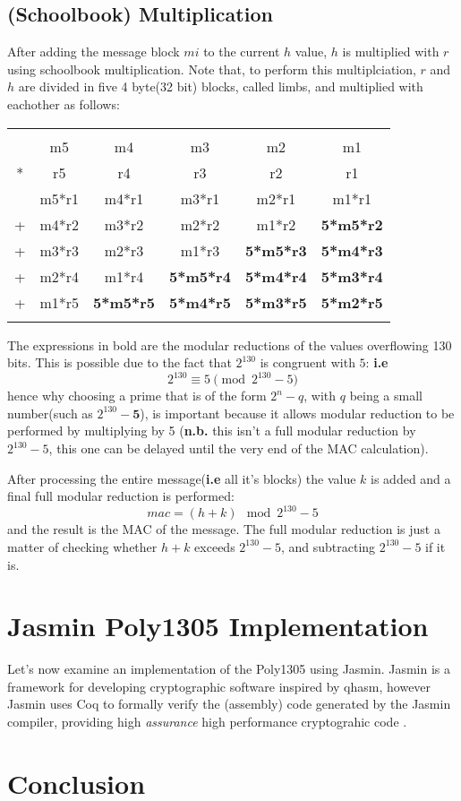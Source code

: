 \documentclass[twocolumn]{article}
\begin{document}
\subsection{(Schoolbook) Multiplication}
After adding the message block $mi$ to the current $h$ value, $h$ is multiplied with $r$ using schoolbook multiplication. Note that, to perform this multiplciation, 
$r$ and $h$ are divided in five 4 byte(32 bit) blocks, called limbs, and multiplied with eachother as follows:
\begin{footnotesize}
\begin{tabular}{cccccc}
    &    &    &    &    &    \\
    & m5 & m4 & m3 & m2 & m1 \\
*   & r5 & r4 & r3 & r2 & r1 \\
\hline
    & m5*r1 & m4*r1 & m3*r1 & m2*r1 & m1*r1 \\
+   & m4*r2 & m3*r2 & m2*r2 & m1*r2 & \textbf{5*m5*r2} \\
+   & m3*r3 & m2*r3 & m1*r3 & \textbf{5*m5*r3} & \textbf{5*m4*r3} \\
+   & m2*r4 & m1*r4 & \textbf{5*m5*r4} & \textbf{5*m4*r4} & \textbf{5*m3*r4} \\
+   & m1*r5 & \textbf{5*m5*r5} & \textbf{5*m4*r5} & \textbf{5*m3*r5} & \textbf{5*m2*r5}\\
    &    &    &    &    &    \\
\end{tabular}
\end{footnotesize}
The expressions in bold are the modular reductions of the values overflowing 130 bits. This is possible due to the fact that $2^{130}$ is congruent with $5$:
\textbf{i.e} $$2^{130} \equiv 5 \pmod{2^{130}-5}$$ hence why choosing a prime that is of the form $2^n-q$, with $q$ being a small number(such as $2^{130}-\textbf{5}$), 
is important because it allows modular reduction to be performed by multiplying by 5 (\textbf{n.b.} this isn't a full modular reduction by $2^{130}-5$, this one can be 
delayed until the very end of the MAC calculation).

After processing the entire message(\textbf{i.e} all it's blocks) the value $k$ is added and a final full modular reduction is performed:
$$mac = (h+k) \mod{2^{130}-5} $$
and the result is the MAC of the message.
\newline
The full modular reduction is just a matter of checking whether $h+k$ exceeds $2^{130}-5$, and subtracting $2^{130}-5$ if it is.

\section{Jasmin Poly1305 Implementation}
Let's now examine an implementation of the Poly1305 using Jasmin. Jasmin is a framework for developing cryptographic software inspired by qhasm, however Jasmin uses Coq 
to formally verify the (assembly) code generated by the Jasmin compiler, providing high \textit{assurance} high performance cryptograhic code \cite{jasmin_paper}.

\section{Conclusion}

\printbibliography

\onecolumn
\begin{appendices}
\end{appendices}
\end{document}
